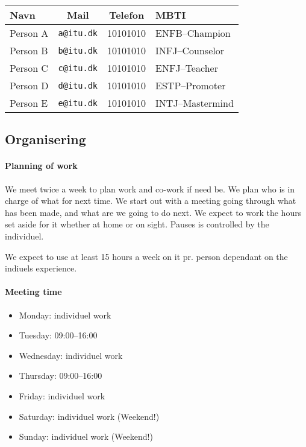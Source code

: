 \documentclass[11pt]{article}
\begin{document}
\begin{table}[h!]
    \centering
    \begin{tabular}{l c c l}
        \textbf{Navn} & \textbf{Mail} & \textbf{Telefon} & \textbf{MBTI} \\ \hline
        Person A & \texttt{a@itu.dk} & 10101010 & ENFB--Champion \\
        Person B & \texttt{b@itu.dk} & 10101010 & INFJ--Counselor \\
        Person C & \texttt{c@itu.dk} & 10101010 & ENFJ--Teacher \\
        Person D & \texttt{d@itu.dk} & 10101010 & ESTP--Promoter \\
        Person E & \texttt{e@itu.dk} & 10101010 & INTJ--Mastermind \\
    \end{tabular}
\end{table}

\subsection{Organisering}

\paragraph{Planning of work}
We meet twice a week to plan work and co-work if need be. We plan who is in charge of what for next time.
We start out with a meeting going through what has been made, and what are we going to do next.
We expect to work the hours set aside for it whether at home or on sight. Pauses is controlled by the individuel.

We expect to use at least 15 hours a week on it pr. person dependant on the indiuels experience.

\paragraph{Meeting time}

\begin{itemize}
    \item Monday: individuel work
    \item Tuesday: 09:00--16:00
    \item Wednesday: individuel work
    \item Thursday: 09:00--16:00
    \item Friday: individuel work
    \item Saturday: individuel work (Weekend!)
    \item Sunday: individuel work (Weekend!)
\end{itemize}
\end{document}
